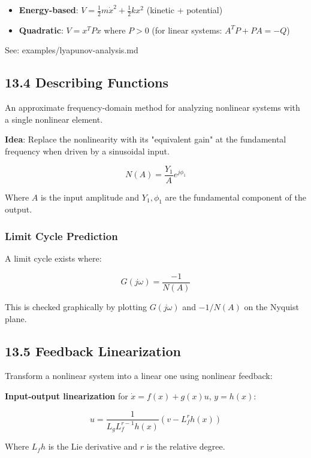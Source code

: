\documentclass[11pt,a4paper]{book}
\begin{document}
\begin{itemize}
\begin{itemize}
\item \textbf{Energy-based}: $V = \frac{1}{2}m\dot{x}^2 + \frac{1}{2}kx^2$ (kinetic + potential)
\item \textbf{Quadratic}: $V = x^T P x$ where $P > 0$ (for linear systems: $A^T P + PA = -Q$)
\end{itemize}

See: examples/lyapunov-analysis.md

\medskip\noindent\hrulefill\medskip

\subsection{13.4 Describing Functions}

An approximate frequency-domain method for analyzing nonlinear systems with a single nonlinear element.

\textbf{Idea}: Replace the nonlinearity with its "equivalent gain" at the fundamental frequency when driven by a sinusoidal input.

\[N(A) = \frac{Y_1}{A} e^{j\phi_1}\]

Where $A$ is the input amplitude and $Y_1, \phi_1$ are the fundamental component of the output.

\subsubsection{Limit Cycle Prediction}

A limit cycle exists where:

\[G(j\omega) = \frac{-1}{N(A)}\]

This is checked graphically by plotting $G(j\omega)$ and $-1/N(A)$ on the Nyquist plane.

\medskip\noindent\hrulefill\medskip

\subsection{13.5 Feedback Linearization}

Transform a nonlinear system into a linear one using nonlinear feedback:

\textbf{Input-output linearization} for $\dot{x} = f(x) + g(x)u$, $y = h(x)$:

\[u = \frac{1}{L_g L_f^{r-1} h(x)} \left(v - L_f^r h(x)\right)\]

Where $L_f h$ is the Lie derivative and $r$ is the relative degree.


\end{itemize}
\end{document}
